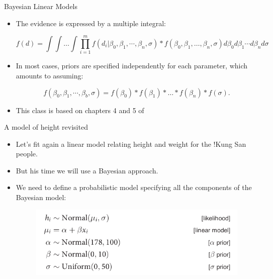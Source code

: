 \documentclass[handout]{beamer}
\begin{document}
\begin{frame}{Bayesian Linear Models}
\scriptsize{
\begin{itemize}


\item The evidence is expressed by a multiple integral:

\begin{displaymath}
 f(d) = \int \int \dots \int \prod_{i=1}^m f(d_i|\beta_0,\beta_1,\cdots,\beta_n,\sigma)* f(\beta_0,\beta_1,\dots,\beta_n,\sigma) d\beta_0 d\beta_1 \cdots d\beta_nd\sigma
\end{displaymath}



\item In most cases, priors are specified independently for each parameter, which amounts to assuming:


\begin{displaymath}
f(\beta_0,\beta_1,\cdots,\beta_b,\sigma)=f(\beta_0)*f(\beta_1)*\dots*f(\beta_n)*f(\sigma). 
\end{displaymath}



\item This class is based on chapters 4 and 5 of \cite{mcelreath2020statistical}



 
\end{itemize}



} 

\end{frame}



\begin{frame}[fragile]{A model of height revisited}
\scriptsize{
\begin{itemize}
 \item  Let's fit again a linear model relating height and weight for the !Kung San people.
 
 \item But his time we will use a Bayesian approach.
 
 \item We need to define a probabilistic model specifying all the components of the Bayesian model:
 
 \begin{figure}[h!]
	\centering
	\includegraphics[scale=0.4]{pics/height_model.png}
\end{figure}
 
\end{itemize}
 

 
}
\end{frame}
\end{document}
